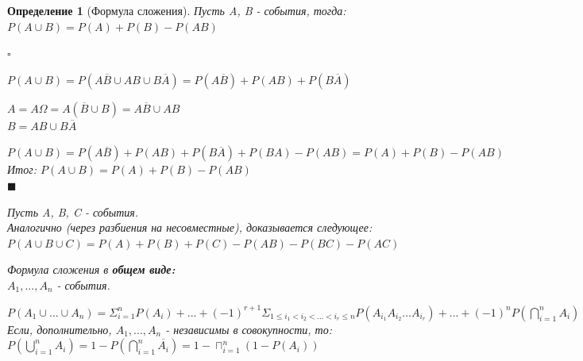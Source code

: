 \documentclass[14pt]{extarticle}
\theoremstyle{breakstyle}
\newtheorem{definition}{Определение}[subsection]
\begin{document}
\begin{definition}[Формула сложения]

Пусть A, B - события, тогда: \\
$P(A \cup B) = P(A) + P(B) - P(AB)$

$\square$

$P(A \cup B) = P(A \overline{B} \cup AB \cup B \overline{A}) = P(A \overline{B}) + P(AB) + P(B \overline{A})$ \\

\vspace{\baselineskip}

$A = A \Omega = A(\overline{B} \cup B) =  A \overline{B} \cup AB$ \\
$B = AB \cup B \overline{A}$ \\

\vspace{\baselineskip}

$P(A \cup B) = P(A \overline{B}) + P(AB) + P(B \overline{A}) + P(BA) - P(AB) = P(A) + P(B) - P(AB)$ \\
Итог: $P(A \cup B) = P(A) + P(B) - P(AB)$ \\

\hfill$\blacksquare$

\vspace{1\baselineskip}

Пусть A, B, C - события. \\
Аналогично (через разбиения на несовместные), доказывается следующее: \\
$P(A \cup B \cup C) = P(A) + P(B) + P(C) - P(AB) - P(BC) - P(AC)$ \\

\vspace{\baselineskip}

Формула сложения в \textbf{общем виде:}\\
$A_{1}, ... , A_{n}$ - события.

$P(A_{1} \cup ... \cup A_{n}) = \Sigma_{i=1}^{n}P(A_{i}) + ... + {(-1)}^{r+1}\Sigma_{1 \leq i_{1} < i_{2} < ... < i_{r} \leq n}P(A_{i_{1}}A_{i_{2}}...A_{i_{r}}) + ... + {(-1)}^{n}P(\bigcap_{i=1}^{n}A_{i})$ \\

\vspace{\baselineskip}
Если, дополнительно, $A_{1}, ... , A_{n}$ - независимы в совокупности, то: \\
$P(\bigcup_{i=1}^{n}A_{i}) = 1 - P(\bigcap_{i=1}^{n}\overline{A_{i}}) = 1 - \sqcap_{i=1}^{n}(1 - P(A_{i}))$

\end{definition}
\end{document}
